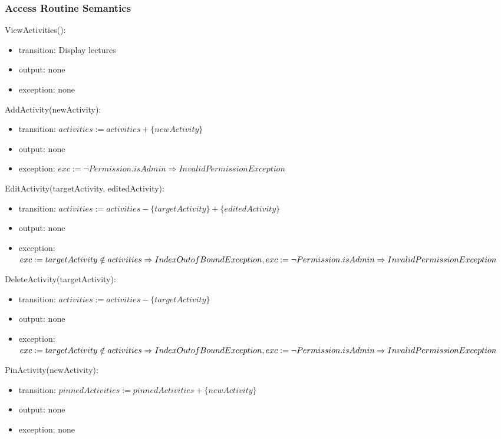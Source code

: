 \documentclass[12pt, titlepage]{article}
\begin{document}
\subsubsection{Access Routine Semantics}

\noindent ViewActivities():
\begin{itemize}
\item transition: Display lectures
\item output: none
\item exception: none
\end{itemize}

\noindent AddActivity(newActivity):
\begin{itemize}
\item transition: $activities := activities + \{newActivity\}$
\item output: none
\item exception: $exc := \neg Permission.isAdmin \Rightarrow InvalidPermission Exception$
\end{itemize}

\noindent EditActivity(targetActivity, editedActivity):
\begin{itemize}
\item transition: $activities := activities - \{targetActivity\} + \{editedActivity\}$
\item output: none
\item exception: $exc := targetActivity \notin activities \Rightarrow IndexOutofBound Exception,\\ 
                  exc := \neg Permission.isAdmin \Rightarrow InvalidPermission Exception$
\end{itemize}

\noindent DeleteActivity(targetActivity):
\begin{itemize}
\item transition: $activities := activities - \{targetActivity\}$
\item output: none
\item exception: $exc := targetActivity \notin activities \Rightarrow IndexOutofBound Exception,\\
                  exc := \neg Permission.isAdmin \Rightarrow InvalidPermission Exception$
\end{itemize}

\noindent PinActivity(newActivity):
\begin{itemize}
\item transition: $pinnedActivities := pinnedActivities + \{newActivity\}$
\item output: none
\item exception: none
\end{itemize}
\end{document}
